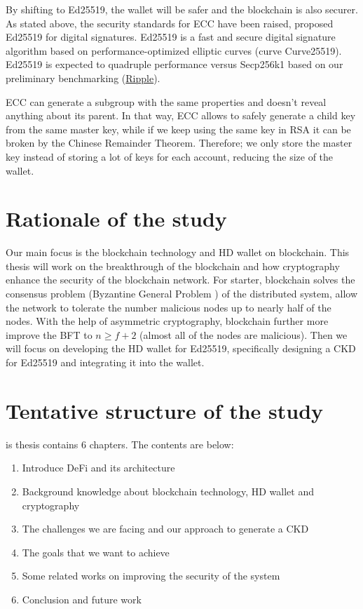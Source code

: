 By shifting to Ed25519, the wallet will be safer and the blockchain is also securer. As stated above, the security standards for ECC have been raised, proposed Ed25519 for digital signatures. Ed25519 is a fast and secure digital signature algorithm based on performance-optimized elliptic curves (curve Curve25519). Ed25519 is expected to quadruple performance versus Secp256k1 based on our preliminary benchmarking (\href{https://ripple.com/insights/curves-with-a-twist/}{Ripple}).

ECC can generate a subgroup with the same properties and doesn't reveal anything about its parent. In that way, ECC allows to safely generate a child key from the same master key, while if we keep using the same key in RSA it can be broken by the Chinese Remainder Theorem. Therefore; we only store the master key instead of storing a lot of keys for each account, reducing the size of the wallet.


\section{Rationale of the study}

Our main focus is the blockchain technology and HD wallet on blockchain. This thesis will work on the breakthrough of the blockchain and how cryptography enhance the security of the blockchain network. For starter, blockchain solves the consensus problem (Byzantine General Problem \cite{DBLP:journals/toplas/LamportSP82}) of the distributed system, allow the network to tolerate the number malicious nodes up to nearly half of the nodes. With the help of asymmetric cryptography, blockchain further more improve the BFT to $n \geq f + 2$ (almost all of the nodes are malicious). Then we will focus on developing the HD wallet for Ed25519, specifically designing a CKD for Ed25519 and integrating it into the wallet.

\section{Tentative structure of the study}

is thesis contains 6 chapters. The contents are below:

\begin{enumerate}
  \item Introduce DeFi and its architecture
  \item Background knowledge about blockchain technology, HD wallet and cryptography
  \item The challenges we are facing and our approach to generate a CKD
  \item The goals that we want to achieve
  \item Some related works on improving the security of the system
  \item Conclusion and future work
\end{enumerate}

